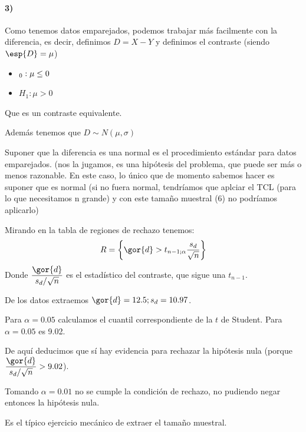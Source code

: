 \begin{problem}[6]
\paragraph{3)} Como tenemos datos emparejados, podemos trabajar más facilmente con la diferencia, es decir, definimos $D=X-Y$ y definimos el contraste (siendo $\esp{D}=\mu$)
\begin{itemize}
\item $\Huge_0 : \mu \leq 0$
\item $H_1: \mu >0$
\end{itemize}

Que es un contraste equivalente.

Además tenemos que $D \sim N(\mu,\sigma)$ 

Suponer que la diferencia es una normal es el procedimiento estándar para datos emparejados. (nos la jugamos, es una hipótesis del problema, que puede ser más o menos razonable. En este caso, lo único que de momento sabemos hacer es suponer que es normal (si no fuera normal, tendríamos que aplciar el TCL (para lo que necesitamos n grande) y con este tamaño muestral (6) no podríamos aplicarlo)

Mirando en la tabla de regiones de rechazo tenemos:
\[R = \left\{\gor{d}> t_{n-1;\alpha} \frac{s_d}{\sqrt{n}}\right\}\]
Donde $\displaystyle \frac{\gor{d}}{s_d/\sqrt{n}}$ es el estadístico del contraste, que sigue una $t_{n-1}$.

De los datos extraemos $\gor{d} = 12.5;s_d=10.97$.

Para $\alpha = 0.05$ calculamos el cuantil correspondiente de la $t$ de Student. Para $\alpha = 0.05$ es 9.02.

De aquí deducimos que sí hay evidencia para rechazar la hipótesis nula (porque  $\displaystyle \frac{\gor{d}}{s_d/\sqrt{n}} > 9.02$).

\spart Tomando $\alpha = 0.01$ no se cumple la condición de rechazo, no pudiendo negar entonces la hipótesis nula.

\spart Es el típico ejercicio mecánico de extraer el tamaño muestral. %
\end{problem}



